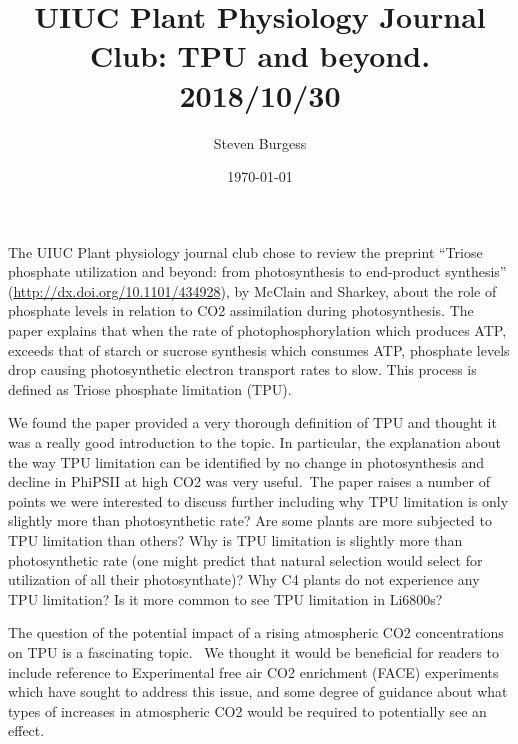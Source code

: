 \documentclass[10pt]{article}
\begin{document}
\title{UIUC Plant Physiology Journal Club: TPU and beyond. 2018/10/30}



\author[1]{Steven Burgess}%
%


\vspace{-1em}



  \date{\today}


\begingroup
\let\center\flushleft
\let\endcenter\endflushleft
\maketitle
\endgroup









The UIUC Plant physiology journal club chose to review the preprint
``Triose phosphate utilization and beyond: from photosynthesis to
end-product synthesis'' (\url{http://dx.doi.org/10.1101/434928}), by
McClain and Sharkey, about the role of phosphate levels in relation to
CO2 assimilation during photosynthesis. The paper explains that when the
rate of photophosphorylation which produces ATP, exceeds that of starch
or sucrose synthesis which consumes ATP, phosphate levels drop causing
photosynthetic electron transport rates to slow. This process is defined
as Triose phosphate limitation (TPU).

\textbf{}

We found the paper provided a very thorough definition of TPU and
thought it was a really good introduction to the topic. In particular,
the explanation about the way TPU limitation can be identified by no
change in photosynthesis and decline in PhiPSII at high CO2 was very
useful.~The paper raises a number of points we were interested to
discuss further including why TPU limitation is only slightly more than
photosynthetic rate? Are some plants are more subjected to TPU
limitation than others? Why is TPU limitation is slightly more than
photosynthetic rate (one might predict that natural selection would
select for utilization of all their photosynthate)? Why C4 plants do not
experience any TPU limitation? Is it more common to see TPU limitation
in Li6800s?

\par\null

The question of the potential impact of a rising atmospheric CO2
concentrations on TPU is a fascinating topic.~ We thought it would be
beneficial for readers to include reference to Experimental free air CO2
enrichment (FACE) experiments which have sought to address this issue,
and some degree of guidance about what types of increases in atmospheric
CO2 would be required to potentially see an effect.~
\end{document}
